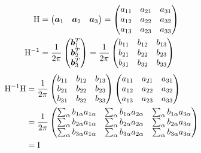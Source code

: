 \documentclass[11pt,a4paper,uplatex]{jsarticle}
\begin{document}
\begin{align}
{\rm H} &= \begin{pmatrix} \bm{a}_{1} & \bm{a}_{2} & \bm{a}_{3} \end{pmatrix} 
    = \begin{pmatrix} 
        a_{11} & a_{21} & a_{31} \\
        a_{12} & a_{22} & a_{32} \\
        a_{13} & a_{23} & a_{33} \\
    \end{pmatrix} \\
{\rm H}^{-1} &= \frac{1}{2\pi} \begin{pmatrix} \bm{b}_{1}^{T} \\ \bm{b}_{2}^{T} \\ \bm{b}_{3}^{T} \end{pmatrix} 
    = \frac{1}{2\pi}\begin{pmatrix} 
        b_{11} & b_{12} & b_{13} \\
        b_{21} & b_{22} & b_{23} \\
        b_{31} & b_{32} & b_{33} \\
    \end{pmatrix} \\
\end{align}
\begin{align}
    {\rm H^{-1} H} &=\frac{1}{2\pi} 
    \begin{pmatrix} 
        b_{11} & b_{12} & b_{13} \\
        b_{21} & b_{22} & b_{23} \\
        b_{31} & b_{32} & b_{33} \\
    \end{pmatrix} 
    \begin{pmatrix} 
        a_{11} & a_{21} & a_{31} \\
        a_{12} & a_{22} & a_{32} \\
        a_{13} & a_{23} & a_{33} \\
    \end{pmatrix} \\
    &=\frac{1}{2\pi} 
    \begin{pmatrix} 
        \sum_{\alpha} b_{1 \alpha} a_{1 \alpha} & \sum_{\alpha} b_{1 \alpha} a_{2 \alpha}  & \sum_{\alpha} b_{1 \alpha} a_{3 \alpha}  \\
        \sum_{\alpha} b_{2 \alpha} a_{1 \alpha} & \sum_{\alpha} b_{2 \alpha} a_{2 \alpha}  & \sum_{\alpha} b_{2 \alpha} a_{3 \alpha}  \\
        \sum_{\alpha} b_{3 \alpha} a_{1 \alpha} & \sum_{\alpha} b_{3 \alpha} a_{2 \alpha}  & \sum_{\alpha} b_{3 \alpha} a_{3 \alpha}  \\
    \end{pmatrix}\\ 
    &= {\rm I}
\end{align}
\end{document}
